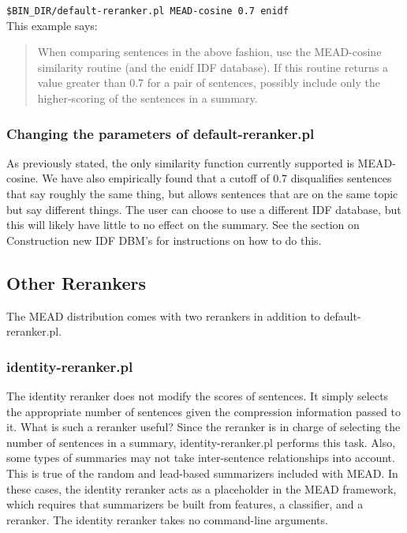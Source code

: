 \documentclass[10pt]{article}
\begin{document}
    \verb|$BIN_DIR/default-reranker.pl MEAD-cosine 0.7 enidf|\\

\noindent
This example says:

\begin{quote}
When comparing sentences in the above fashion, use the
MEAD-cosine similarity routine (and the enidf IDF database).  
If this routine returns a value greater
than 0.7 for a pair of sentences, possibly include only the 
higher-scoring of the sentences in a summary.
\end{quote}


\subsubsection{Changing the parameters of default-reranker.pl}

As previously stated, the only similarity function currently
supported is MEAD-cosine.  We have also empirically found
that a cutoff of 0.7 disqualifies sentences that say roughly
the same thing, but allows sentences that are on the same
topic but say different things.  The user can choose to use
a different IDF database, but this will likely have little
to no effect on the summary.  See the section on Construction
new IDF DBM's for instructions on how to do this.


\subsection{Other Rerankers}

The MEAD distribution comes with two rerankers in addition to 
default-reranker.pl.

\subsubsection{identity-reranker.pl}

The identity reranker does not modify the scores of 
sentences.  It simply selects the appropriate number of 
sentences given the compression information passed to it.
What is such a reranker useful?  Since the reranker is 
in charge of selecting the number of sentences in a summary,
identity-reranker.pl performs this task.  Also, some 
types of summaries may not take inter-sentence relationships
into account.  This is true of the random and lead-based 
summarizers included with MEAD.  In these cases, the identity
reranker acts as a placeholder in the MEAD framework, 
which requires that summarizers be built from features, a
classifier, and a reranker.  The identity reranker takes
no command-line arguments.
\end{document}
